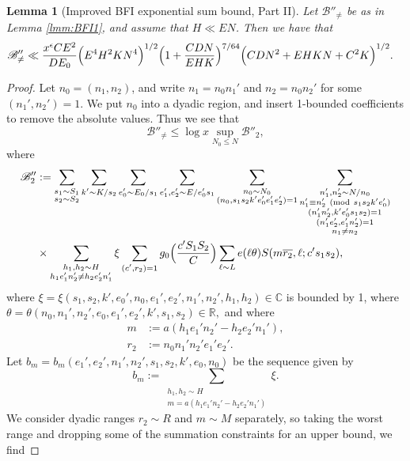 \documentclass[10pt]{amsart}
\theoremstyle{plain}
\newtheorem{lmm}[thrm]{Lemma}
\numberwithin{equation}{section}
\newcommand{\Mod}[1]{\ (\mathrm{mod}\ #1)}
\begin{document}
%
%
%
%
%
%
%
%
\begin{lmm}[Improved BFI exponential sum bound, Part II]\label{lmm:BFI2}
Let $\mathscr{B}''_{\ne}$ be as in Lemma \ref{lmm:BFI1}, and assume that $H\ll EN$. Then we have that
\begin{align*}
\mathscr{B}_{\ne}''&\ll \frac{x^\epsilon C E^2}{D E_0}\Bigl(E^{4} H^2 K N^{4}\Bigr)^{1/2}\Bigl(1+\frac{C D N}{E H K}\Bigr)^{7/64}\Bigl(C D N^2+ E H K N+C^2 K\Bigr)^{1/2}.
\end{align*}
\end{lmm}
%
%
%
%
\begin{proof}
Let $n_0=(n_1,n_2)$, and write $n_1=n_0n_1'$ and $n_2=n_0n_2'$ for some $(n_1',n_2')=1$. We put $n_0$ into a dyadic region, and insert 1-bounded coefficients to remove the absolute values. Thus we see that
\[
\mathscr{B}''_{\ne}\le \log{x}\sup_{N_0\le N}\mathscr{B}''_{2},
\]
where
\begin{align*}
\mathscr{B}''_{2}&:=\sum_{\substack{s_1\sim S_1\\ s_2\sim S_2}}\sum_{\substack{k'\sim K/s_2}} \sum_{\substack{e_0'\sim E_0/s_1}}\sum_{\substack{e_1',e_2'\sim E/e_0's_1}}\sum_{\substack{n_0\sim N_0\\ (n_0,s_1s_2k'e_0'e_1'e_2')=1}}\sum_{\substack{n_1',n_2'\sim N/n_0\\ n_1'\equiv n_2'\Mod{s_1s_2 k' e_0'}\\ (n_1'n_2',k'e_0's_1s_2)=1\\ (n_1'e_2',e_1'n_2')=1\\ n_1\ne n_2}}\\
&\times \sum_{\substack{h_1,h_2\sim H\\ h_1e_1'n_2'\ne h_2e_2'n_1'}}\xi\sum_{\substack{(c',r_2)=1}}g_0\Bigl(\frac{c'S_1S_2}{C}\Bigr)\sum_{\ell\sim L}e(\ell\theta)S(m\overline{r_2},\ell;c' s_1 s_2),
\end{align*}
where $\xi=\xi(s_1,s_2,k',e_0',n_0,e_1',e_2',n_1',n_2',h_1,h_2)\in \mathbb{C}$ is bounded by 1, where $\theta=\theta(n_0,n_1',n_2',e_0,e_1',e_2',k',s_1,s_2)\in\mathbb{R},$ and where
\begin{align*}
m&:=a(h_1e_1'n_2'-h_2e_2'n_1'),\\
r_2&:=n_0n_1'n_2'e_1'e_2'.
\end{align*}
Let $b_m=b_m(e_1',e_2',n_1',n_2',s_1,s_2,k',e_0,n_0)$ be the sequence given by
\[
b_{m}:=
\sum_{\substack{h_1,h_2\sim H \\ m=a(h_1e_1'n_2'-h_2e_2'n_1')}}\xi.\]
We consider dyadic ranges $r_2\sim R$ and $m\sim M$ separately, so taking the worst range and dropping some of the summation constraints for an upper bound, we find

\end{proof}
\end{document}
